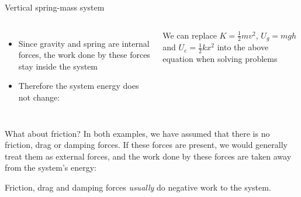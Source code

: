 \documentclass[12pt,compress,aspectratio=169]{beamer}
\begin{document}
\begin{frame}[t]{Vertical spring-mass system}
  \begin{columns}[T]
    \centering

    \begin{itemize}
    \item Since gravity and spring are internal forces, the work done by these
      forces stay inside the system
    \item Therefore the system energy does not change:

    \end{itemize}
    We can replace $K=\frac12mv^2$, $U_g=mgh$ and $U_e=\frac12kx^2$ into the
    above equation when solving problems
  \end{columns}
\end{frame}



\begin{frame}{What about friction?}
  In both examples, we have assumed that {\color{orange}there is no friction,
    drag or damping forces}. If these forces are present, we would generally
  treat them as external forces, and the work done by these forces are taken
  away from the system's energy:


  Friction, drag and damping forces \emph{usually} do negative work to the
  system.
\end{frame}
\end{document}
